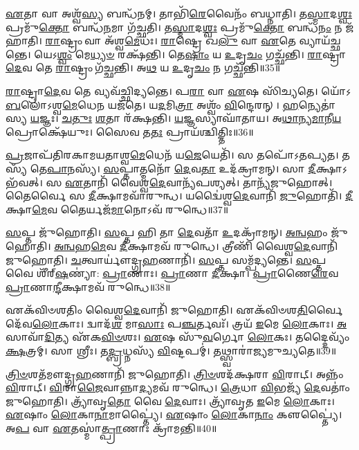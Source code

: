 \-\ul{𑌏}\-𑌤𑌾 𑌵𑌾 𑌅𑌶𑍍𑌵᳴\-\ul{𑌸𑍍𑌯} 𑌬𑌨𑍍𑌧᳴𑌨𑌮𑍍।
𑌤𑌾𑌭𑌿᳴\-\ul{𑌰𑍇}\-𑌵𑍈𑌨𑌂᳴ 𑌬𑌧𑍍𑌨𑌾𑌤𑌿।
𑌤\-\ul{𑌸𑍍𑌮𑌾}\-𑌦\-\ul{𑌶𑍍𑌵𑌃} 𑌪𑍍𑌰𑌮𑍁᳴\-\ul{𑌕𑍍𑌤𑍋} 𑌬𑌨𑍍𑌧᳴\-\ul{𑌨}\-𑌮𑌾 𑌗᳴𑌚𑍍𑌛𑌤𑌿।
𑌤\-\ul{𑌸𑍍𑌮𑌾}\-𑌦\-\ul{𑌶𑍍𑌵𑌃} 𑌪𑍍𑌰𑌮𑍁᳴\-\ul{𑌕𑍍𑌤𑍋} 𑌬𑌨𑍍𑌧᳴\-\ul{𑌨𑌂} 𑌨 𑌜᳴𑌹𑌾𑌤𑌿।
\-\ul{𑌰𑌾}\-𑌷𑍍𑌟𑍍𑌰𑌂 𑌵𑌾 𑌅᳴𑌶𑍍𑌵\-\ul{𑌮𑍇}\-𑌧𑌃।
\-\ul{𑌰𑌾}\-𑌷𑍍𑌟𑍍𑌰𑍇 𑌖\-\ul{𑌲𑍁} 𑌵𑌾 \ul{𑌏}\-𑌤𑍇 𑌵𑍍𑌯𑌾𑌯᳴𑌚𑍍𑌛𑌨𑍍𑌤𑍇।
𑌯𑍇𑌽\-\ul{𑌶𑍍𑌵𑌂} 𑌮𑍇\-\ul{𑌧𑍍𑌯}\-\-\ul{𑍞} 𑌰𑌕𑍍𑌷᳴𑌨𑍍𑌤𑌿।
𑌤𑍇\-\ul{𑌷𑌾𑌂} 𑌯 \ul{𑌉}\-𑌦𑍃\-\ul{𑌚𑌂} 𑌗𑌚𑍍𑌛᳴𑌨𑍍𑌤𑌿।
\-\ul{𑌰𑌾}\-𑌷𑍍𑌟𑍍𑌰𑌾\-\ul{𑌦𑍇}\-𑌵 𑌤𑍇 \ul{𑌰𑌾}\-𑌷𑍍𑌟𑍍𑌰𑌂 𑌗᳴𑌚𑍍𑌛𑌨𑍍𑌤𑌿।
𑌅\-\ul{𑌥} 𑌯 \ul{𑌉}\-𑌦𑍃\-\ul{𑌚𑌂} 𑌨 𑌗𑌚𑍍𑌛᳴𑌨𑍍𑌤𑌿॥35॥

\-\ul{𑌰𑌾}\-𑌷𑍍𑌟𑍍𑌰𑌾\-\ul{𑌦𑍇}\-𑌵 𑌤𑍇 𑌵𑍍𑌯𑌵᳴𑌚𑍍𑌛𑌿𑌦𑍍𑌯𑌨𑍍𑌤𑍇।
𑌪\-\ul{𑌰𑌾} 𑌵𑌾 \ul{𑌏}\-𑌷 𑌸𑌿᳴𑌚𑍍𑌯𑌤𑍇।
𑌯𑍋᳴𑌽\-\ul{𑌬}\-𑌲𑍋॑\-𑌽𑌶𑍍𑌵\-\ul{𑌮𑍇}\-𑌧𑍇\-\ul{𑌨} 𑌯𑌜᳴𑌤𑍇।
𑌯\-\ul{𑌦}\-𑌮𑌿\-\ul{𑌤𑍍𑌰𑌾} 𑌅𑌶𑍍𑌵𑌂᳴ \ul{𑌵𑌿}\-𑌨𑍍𑌦𑍇𑌰𑌨𑍍।
\-\ul{𑌹}\-𑌨𑍍𑌯𑍇𑌤𑌾॑𑌸𑍍𑌯 \ul{𑌯}\-𑌜𑍍𑌞𑌃।
\-\ul{𑌚}\-\-\ul{𑌤𑍁𑌃} \ul{𑌶}\-𑌤𑌾 𑌰᳴𑌕𑍍𑌷𑌨𑍍𑌤𑌿।
\-\ul{𑌯}\-𑌜𑍍𑌞𑌸𑍍𑌯𑌾𑌘𑌾᳴𑌤𑌾𑌯।
𑌅\-\ul{𑌥𑌾}\-𑌨𑍍𑌯\-\ul{𑌮𑌾}\-𑌨𑍀\-\ul{𑌯} 𑌪𑍍𑌰𑍋𑌕𑍍𑌷𑍇᳴𑌯𑍁𑌃।
𑌸𑍈𑌵 𑌤\-\ul{𑌤𑌃} 𑌪𑍍𑌰𑌾𑌯᳴𑌶𑍍𑌚𑌿𑌤𑍍𑌤𑌿𑌃॥36॥\anuvakamend[\-\ul{𑌗}\-\-\ul{𑌚𑍍𑌛}\-\-\ul{𑌤𑌿} \ul{𑌭}\-\-\ul{𑌵}\-\-\ul{𑌤𑌃} \ul{𑌪}\-𑌥𑍍𑌸𑍁 𑌜𑍁᳴𑌹𑍋\-\ul{𑌤𑌿} 𑌨 𑌗𑌚𑍍𑌛᳴\-\ul{𑌨𑍍𑌤𑌿} 𑌨𑌵᳴ 𑌚]

\-\ul{𑌪𑍍𑌰}\-𑌜𑌾𑌪᳴𑌤𑌿𑌰𑌕𑌾𑌮𑌯𑌤𑌾𑌶𑍍𑌵\-\ul{𑌮𑍇}\-𑌧𑍇𑌨᳴ 𑌯\-\ul{𑌜𑍇}\-𑌯𑍇𑌤𑌿᳴।
𑌸 𑌤𑌪𑍋᳴\-𑌽𑌤𑌪𑍍𑌯𑌤।
𑌤𑌸𑍍𑌯᳴ 𑌤𑍇\-\ul{𑌪𑌾}\-𑌨𑌸𑍍𑌯᳴।
\-\ul{𑌸}\-𑌪𑍍𑌤𑌾𑌤𑍍𑌮𑌨𑍋᳴ \ul{𑌦𑍇}\-𑌵\-\ul{𑌤𑌾} 𑌉𑌦᳴𑌕𑍍𑌰𑌾𑌮𑌨𑍍।
𑌸𑌾 \ul{𑌦𑍀}\-𑌕𑍍𑌷𑌾\-𑌽𑌭᳴𑌵𑌤𑍍।
𑌸 \ul{𑌏}\-𑌤𑌾𑌨𑌿᳴ 𑌵𑍈𑌶𑍍𑌵\-\ul{𑌦𑍇}\-𑌵𑌾𑌨𑍍𑌯᳴𑌪𑌶𑍍𑌯𑌤𑍍।
𑌤𑌾𑌨𑍍𑌯᳴𑌜𑍁𑌹𑍋𑌤𑍍।
𑌤𑍈𑌰𑍍𑌵𑍈 𑌸 \ul{𑌦𑍀}\-𑌕𑍍𑌷𑌾𑌮𑌵𑌾᳴𑌰𑍁𑌨𑍍𑌧।
𑌯𑌦𑍍𑌵𑍈॑𑌶𑍍𑌵\-\ul{𑌦𑍇}\-𑌵𑌾𑌨𑌿᳴ \ul{𑌜𑍁}\-𑌹𑍋𑌤𑌿᳴।
\-\ul{𑌦𑍀}\-𑌕𑍍𑌷𑌾\-\ul{𑌮𑍇}\-𑌵 𑌤𑍈𑌰𑍍𑌯𑌜᳴\-\ul{𑌮𑌾}\-𑌨𑍋𑌽𑌵᳴ 𑌰𑍁𑌨𑍍𑌧𑍇॥37॥

\-\ul{𑌸}\-𑌪𑍍𑌤 𑌜𑍁᳴𑌹𑍋𑌤𑌿।
\-\ul{𑌸}\-𑌪𑍍𑌤 𑌹𑌿 𑌤𑌾 \ul{𑌦𑍇}\-𑌵𑌤𑌾᳴ \ul{𑌉}\-𑌦𑌕𑍍𑌰𑌾᳴𑌮𑌨𑍍।
\-\ul{𑌅}\-\-\ul{𑌨𑍍𑌵}\-𑌹𑌂 𑌜𑍁᳴𑌹𑍋𑌤𑌿।
\-\ul{𑌅}\-\-\ul{𑌨𑍍𑌵}\-𑌹\-\ul{𑌮𑍇}\-𑌵 \ul{𑌦𑍀}\-𑌕𑍍𑌷𑌾𑌮𑌵᳴ 𑌰𑍁𑌨𑍍𑌧𑍇।
𑌤𑍍𑌰𑍀𑌣𑌿᳴ 𑌵𑍈𑌶𑍍𑌵\-\ul{𑌦𑍇}\-𑌵𑌾𑌨𑌿᳴ 𑌜𑍁𑌹𑍋𑌤𑌿।
\-\ul{𑌚}\-𑌤𑍍𑌵𑌾𑌰𑍍𑌯𑍗॑𑌦𑍍𑌗𑍍𑌰\-\ul{𑌹}\-𑌣𑌾𑌨𑌿᳴।
\-\ul{𑌸}\-𑌪𑍍𑌤 𑌸𑌮𑍍𑌪᳴𑌦𑍍𑌯𑌨𑍍𑌤𑍇।
\-\ul{𑌸}\-𑌪𑍍𑌤 𑌵𑍈 𑌶𑍀᳴𑌰𑍍‌\mbox{}\-\ul{𑌷}\-𑌣𑍍𑌯𑌾॑: \ul{𑌪𑍍𑌰𑌾}\-𑌣𑌾𑌃।
\-\ul{𑌪𑍍𑌰𑌾}\-𑌣𑌾 \ul{𑌦𑍀}\-𑌕𑍍𑌷𑌾।
\-\ul{𑌪𑍍𑌰𑌾}\-𑌣𑍈\-\ul{𑌰𑍇}\-𑌵 \ul{𑌪𑍍𑌰𑌾}\-𑌣𑌾\-\ul{𑌨𑍍𑌦𑍀}\-𑌕𑍍𑌷𑌾𑌮𑌵᳴ 𑌰𑍁𑌨𑍍𑌧𑍇॥38॥

𑌏𑌕᳴𑌵𑌿𑍞𑌶𑌤𑌿𑌂 𑌵𑍈𑌶𑍍𑌵\-\ul{𑌦𑍇}\-𑌵𑌾𑌨𑌿᳴ 𑌜𑍁𑌹𑍋𑌤𑌿।
𑌏𑌕᳴𑌵𑌿𑍞𑌶\-\ul{𑌤𑌿}\-𑌰𑍍𑌵𑍈 𑌦𑍇᳴𑌵\-\ul{𑌲𑍋}\-𑌕𑌾𑌃।
𑌦𑍍𑌵𑌾𑌦᳴\-\ul{𑌶} 𑌮𑌾\-\ul{𑌸𑌾𑌃} 𑌪\-\ul{𑌞𑍍𑌚}\-𑌰𑍍𑌤𑌵𑌃᳴।
𑌤𑍍𑌰𑌯᳴ \ul{𑌇}\-𑌮𑍇 \ul{𑌲𑍋}\-𑌕𑌾𑌃।
\-\ul{𑌅}\-𑌸𑌾𑌵𑌾᳴\-\ul{𑌦𑌿}\-𑌤𑍍𑌯 𑌏᳴𑌕\-\ul{𑌵𑌿}\-\-\ul{𑍞}\-𑌶𑌃।
\-\ul{𑌏}\-𑌷 𑌸𑍁᳴\-\ul{𑌵}\-𑌰𑍍𑌗𑍋 \ul{𑌲𑍋}\-𑌕𑌃।
𑌤𑌦𑍍𑌦𑍈𑌵𑍍𑌯𑌂᳴ \ul{𑌕𑍍𑌷}\-𑌤𑍍𑌰𑌮𑍍।
𑌸𑌾 𑌶𑍍𑌰𑍀𑌃।
𑌤\-\ul{𑌦𑍍𑌬𑍍𑌰}\-𑌧𑍍𑌨𑌸𑍍𑌯᳴ \ul{𑌵𑌿}\-𑌷𑍍𑌟𑌪𑌮𑍍॑।
𑌤𑌥𑍍𑌸𑍍𑌵𑌾𑌰𑌾॑𑌜𑍍𑌯𑌮𑍁𑌚𑍍𑌯𑌤𑍇॥39॥

\-\ul{𑌤𑍍𑌰𑌿}\-\-\ul{𑍞}\-𑌶𑌤᳴𑌮𑍗𑌦𑍍𑌗𑍍𑌰\-\ul{𑌹}\-𑌣𑌾𑌨𑌿᳴ 𑌜𑍁𑌹𑍋𑌤𑌿।
\-\ul{𑌤𑍍𑌰𑌿}\-\-\ul{𑍞}\-𑌶𑌦᳴𑌕𑍍𑌷𑌰𑌾 \ul{𑌵𑌿}\-𑌰𑌾𑌟𑍍।
𑌅𑌨𑍍𑌨𑌂᳴ \ul{𑌵𑌿}\-𑌰𑌾𑌟𑍍।
\-\ul{𑌵𑌿}\-𑌰𑌾\-\ul{𑌜𑍈}\-𑌵𑌾𑌨𑍍𑌨𑌾\-\ul{𑌦𑍍𑌯}\-𑌮𑌵᳴ 𑌰𑍁𑌨𑍍𑌧𑍇।
\-\ul{𑌤𑍍𑌰𑍇}\-𑌧𑌾 \ul{𑌵𑌿}\-𑌭𑌜𑍍𑌯᳴ \ul{𑌦𑍇}\-𑌵𑌤𑌾𑌂॑ 𑌜𑍁𑌹𑍋𑌤𑌿।
𑌤𑍍𑌰𑍍𑌯𑌾᳴𑌵𑍃\-\ul{𑌤𑍋} 𑌵𑍈 \ul{𑌦𑍇}\-𑌵𑌾𑌃।
𑌤𑍍𑌰𑍍𑌯𑌾᳴𑌵𑍃𑌤 \ul{𑌇}\-𑌮𑍇 \ul{𑌲𑍋}\-𑌕𑌾𑌃।
\-\ul{𑌏}\-𑌷𑌾𑌂 \ul{𑌲𑍋}\-𑌕𑌾\-\ul{𑌨𑌾}\-𑌮𑌾𑌪𑍍𑌤𑍍𑌯𑍈॑।
\-\ul{𑌏}\-𑌷𑌾𑌂 \ul{𑌲𑍋}\-𑌕𑌾\-\ul{𑌨𑌾𑌂} 𑌕𑍢𑌪𑍍𑌤𑍍𑌯𑍈॑।
𑌅\-\ul{𑌪} 𑌵𑌾 \ul{𑌏}\-𑌤𑌸𑍍𑌮𑌾॑\-\ul{𑌤𑍍𑌪𑍍𑌰𑌾}\-𑌣𑌾𑌃 𑌕𑍍𑌰𑌾᳴𑌮𑌨𑍍𑌤𑌿॥40॥

